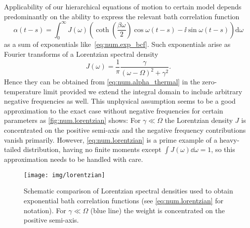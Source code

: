 
Applicability of our hierarchical equations of motion to certain model depends predominantly on the ability to express the relevant bath correlation function
\begin{equation}
  \alpha(t-s) = \int_0^\infty J(\omega) \left( \coth \left( \frac{\beta \omega}{2} \right) \cos \omega(t-s) - \ii\sin \omega(t-s) \right) \mathrm{d}\omega
  \label{eq:num.alpha_thermal}
\end{equation}
as a sum of exponentials like~\ref{eq:num.exp_bcf}.
Such exponentials arise as Fourier transforms of a Lorentzian spectral density
\begin{equation}
  J(\omega) = \frac{1}{\pi} \frac{\gamma}{(\omega - \Omega)^2 + \gamma^2}.
  \label{eq:num.lorentzian}
\end{equation}
Hence they can be obtained from \autoref{eq:num.alpha_thermal} in the zero-temperature limit provided we extend the integral domain to include arbitrary negative frequencies as well.
This unphysical assumption seems to be a good approximation to the exact case without negative frequencies for certain parameters as \autoref{fig:num.lorentzian} shows:
For $\gamma\ll\Omega$ the Lorentzian density $J$ is concentrated on the positive semi-axis and the negative frequency contributions vanish primarily.
However, \autoref{eq:num.lorentzian} is a prime example of a heavy-tailed distribution, having no finite moments except $\int J(\omega) \dd \omega = 1$, so this approximation needs to be handled with care.\\



\begin{figure}
  \centering
  \texttt{[image: img/lorentzian]}
  \caption{%
    Schematic comparison of Lorentzian spectral densities used to obtain exponential bath correlation functions (see \autoref{eq:num.lorentzian} for notation).
    For $\gamma\ll\Omega$ (blue line) the weight is concentrated on the positive semi-axis.
  }
  \label{fig:num.lorentzian}
\end{figure}

